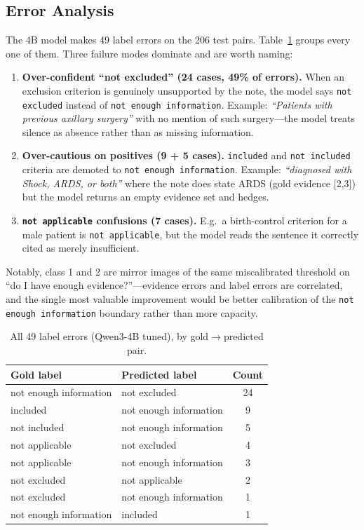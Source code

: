 \documentclass[conference]{IEEEtran}
\begin{document}
\subsection{Error Analysis}
\label{sec:res-err}
The 4B model makes 49 label errors on the 206 test pairs. Table~\ref{tab:errors}
groups every one of them. Three failure modes dominate and are worth naming:

\begin{enumerate}
\item \textbf{Over-confident ``not excluded'' (24 cases, 49\% of errors).} When an
exclusion criterion is genuinely unsupported by the note, the model says
\texttt{not excluded} instead of \texttt{not enough information}. Example:
\emph{``Patients with previous axillary surgery''} with no mention of such
surgery---the model treats silence as absence rather than as missing information.
\item \textbf{Over-cautious on positives (9 + 5 cases).} \texttt{included} and
\texttt{not included} criteria are demoted to \texttt{not enough information}.
Example: \emph{``diagnosed with Shock, ARDS, or both''} where the note does state
ARDS (gold evidence [2,3]) but the model returns an empty evidence set and hedges.
\item \textbf{\texttt{not applicable} confusions (7 cases).} E.g.\ a
birth-control criterion for a male patient is \texttt{not applicable}, but the
model reads the sentence it correctly cited as merely insufficient.
\end{enumerate}

Notably, class 1 and 2 are mirror images of the same miscalibrated threshold on
``do I have enough evidence?''---evidence errors and label errors are correlated,
and the single most valuable improvement would be better calibration of the
\texttt{not enough information} boundary rather than more capacity.

\begin{table}[t]
\caption{All 49 label errors (Qwen3-4B tuned), by gold$\to$predicted pair.}
\label{tab:errors}
\centering
\footnotesize
\begin{tabular}{llc}
\toprule
Gold label & Predicted label & Count \\
\midrule
not enough information & not excluded           & 24 \\
included               & not enough information & 9 \\
not included           & not enough information & 5 \\
not applicable         & not excluded           & 4 \\
not applicable         & not enough information & 3 \\
not excluded           & not applicable         & 2 \\
not excluded           & not enough information & 1 \\
not enough information & included               & 1 \\
\bottomrule
\end{tabular}
\end{table}
\end{document}

